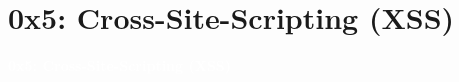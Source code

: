 \documentclass[aspectratio=169]{beamer}
\begin{document}
\section{0x5: Cross-Site-Scripting (XSS)}
{
\begin{frame}
\huge{\textcolor{white}{\textbf{0x5: Cross-Site-Scripting (XSS)}}}
\end{frame}
}
\end{document}
